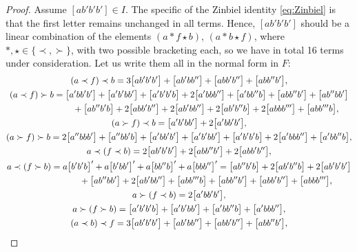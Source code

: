 \documentclass[11pt]{article}
\numberwithin{equation}{section}
\numberwithin{equation}{section}
\begin{document}
\begin{proof}
Assume $[ab'b'b']\in I$.
The specific of the Zinbiel identity \eqref{eq:Zinbiel}
is that the first letter remains unchanged in all terms.
Hence, $[ab'b'b']$ should be a
linear combination of the elements
$(a\ast f\star b)$, $(a\ast b\star f)$,
where $\ast, \star \in \{\prec, \succ \}$,
with two possible bracketing each, so we have in total 16 terms
under consideration. Let us write them all in the normal form in $F$:
\begin{gather*}
(a\prec f)\prec b
 = 3\bigl[ab'b'b'\bigr]+\bigl[ab'bb''\bigr]+\bigl[abb'b''\bigr]+\bigl[abb''b'\bigr], \\
%
(a\prec f)\succ b
 =\bigl[a'bb'b'\bigr]+\bigl[a'b'bb'\bigr]+\bigl[a'b'b'b\bigr]+2\bigl[a'bbb''\bigr]+\bigl[a'bb''b\bigr]+\bigl[abb''b'\bigr]+\bigl[ab''bb'\bigr]\\
\hphantom{(a\prec f)\succ b=}{} +\bigl[ab''b'b\bigr]+2\bigl[abb'b''\bigr]+2\bigl[ab'bb''\bigr]+2\bigl[ab'b''b\bigr]+2\bigl[abbb'''\bigr]+\bigl[abb'''b\bigr], \\
%
(a\succ f)\prec b
 = \bigl[a'b'bb'\bigr]+2\bigl[a'bb'b'\bigr], \\
%
(a\succ f)\succ b
 = 2\bigl[a''bbb'\bigr]+\bigl[a''bb'b\bigr] +\bigl[a'bb'b'\bigr]+\bigl[a'b'bb'\bigr]+\bigl[a'b'b'b\bigr]+2\bigl[a'bbb''\bigr]+\bigl[a'bb''b\bigr], \\
%
a\prec (f\prec b)
 = 2\bigl[ab'b'b'\bigr]+2\bigl[abb''b'\bigr]+2\bigl[abb'b''\bigr], \\
%
a\prec (f\succ b)
 = a\bigl[b'b'b\bigr]'+a\bigl[b'bb'\bigr]' + a\bigl[bb''b\bigr]' + a\bigl[bbb''\bigr]'
 = \bigl[ab''b'b\bigr] + 2\bigl[ab'b''b\bigr]+ 2\bigl[ab'b'b'\bigr]\\
\hphantom{a\prec (f\succ b)=}{} + \bigl[ab''bb'\bigr]+2\bigl[ab'bb''\bigr] +\bigl[abb'''b\bigr]+\bigl[abb''b'\bigr]+\bigl[abb'b''\bigr]+\bigl[abbb'''\bigr], \\
%
a\succ (f\prec b)
 = 2\bigl[a'bb'b'\bigr], \\
%
a\succ (f\succ b)
 = \bigl[a'b'b'b\bigr]+\bigl[a'b'bb'\bigr]+\bigl[a'bb''b\bigr]+\bigl[a'bbb''\bigr], \\
%
(a\prec b)\prec f
 = 3\bigl[ab'b'b'\bigr] + \bigl[ab'bb''\bigr]+\bigl[abb'b''\bigr]+\bigl[abb''b'\bigr], \\

\end{gather*}
\end{proof}
\end{document}
